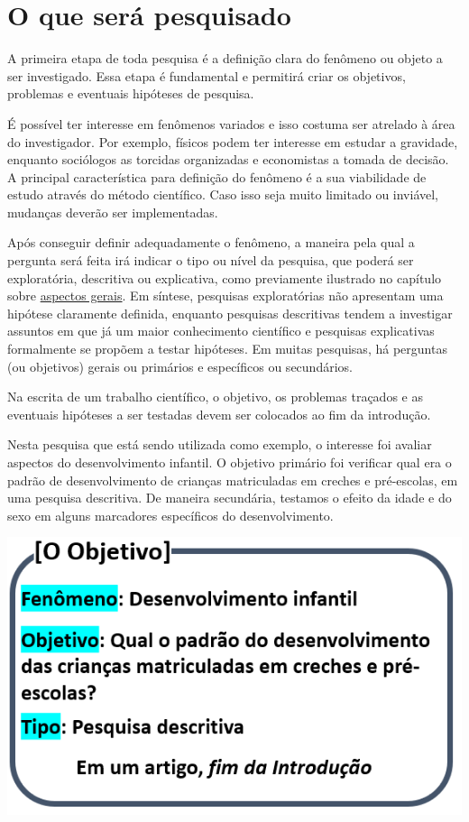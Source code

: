 \documentclass[
]{book}
\begin{document}
\hypertarget{o-que-seruxe1-pesquisado}{%
\section{O que será pesquisado}\label{o-que-seruxe1-pesquisado}}

A primeira etapa de toda pesquisa é a definição clara do fenômeno ou objeto a ser investigado. Essa etapa é fundamental e permitirá criar os objetivos, problemas e eventuais hipóteses de pesquisa.

É possível ter interesse em fenômenos variados e isso costuma ser atrelado à área do investigador. Por exemplo, físicos podem ter interesse em estudar a gravidade, enquanto sociólogos as torcidas organizadas e economistas a tomada de decisão. A principal característica para definição do fenômeno é a sua viabilidade de estudo através do método científico. Caso isso seja muito limitado ou inviável, mudanças deverão ser implementadas.

Após conseguir definir adequadamente o fenômeno, a maneira pela qual a pergunta será feita irá indicar o tipo ou nível da pesquisa, que poderá ser exploratória, descritiva ou explicativa, como previamente ilustrado no capítulo sobre \href{https://anovabr.github.io/mqt/aspectos-gerais.html\#os-objetivos-de-uma-pesquisa}{aspectos gerais}. Em síntese, pesquisas exploratórias não apresentam uma hipótese claramente definida, enquanto pesquisas descritivas tendem a investigar assuntos em que já um maior conhecimento científico e pesquisas explicativas formalmente se propõem a testar hipóteses. Em muitas pesquisas, há perguntas (ou objetivos) gerais ou primários e específicos ou secundários.

Na escrita de um trabalho científico, o objetivo, os problemas traçados e as eventuais hipóteses a ser testadas devem ser colocados ao fim da introdução.

Nesta pesquisa que está sendo utilizada como exemplo, o interesse foi avaliar aspectos do desenvolvimento infantil. O objetivo primário foi verificar qual era o padrão de desenvolvimento de crianças matriculadas em creches e pré-escolas, em uma pesquisa descritiva. De maneira secundária, testamos o efeito da idade e do sexo em alguns marcadores específicos do desenvolvimento.

\includegraphics{./img/cap_pesquisa_aplicada_oque.png}
\end{document}
